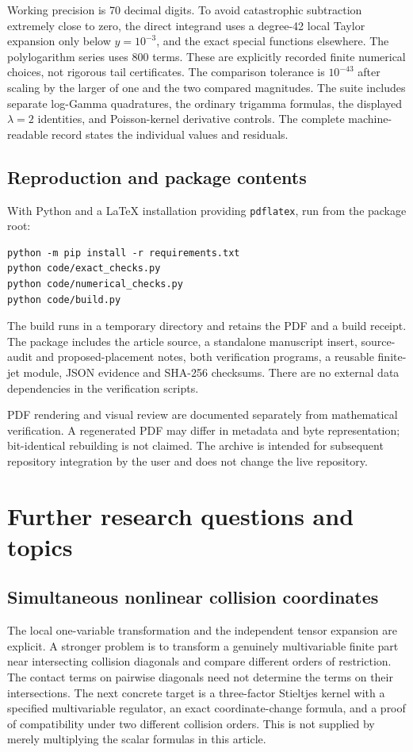 \documentclass[11pt]{article}
\theoremstyle{definition}\newtheorem{definition}[theorem]{Definition}
\theoremstyle{remark}\newtheorem{remark}[theorem]{Remark}
\begin{document}
Working precision is 70 decimal digits. To avoid catastrophic subtraction extremely close to zero, the direct integrand uses a degree-42 local Taylor expansion only below $y=10^{-3}$, and the exact special functions elsewhere. The polylogarithm series uses 800 terms. These are explicitly recorded finite numerical choices, not rigorous tail certificates. The comparison tolerance is $10^{-43}$ after scaling by the larger of one and the two compared magnitudes. The suite includes separate log-Gamma quadratures, the ordinary trigamma formulas, the displayed $\lambda=2$ identities, and Poisson-kernel derivative controls. The complete machine-readable record states the individual values and residuals.



\subsection{Reproduction and package contents}
With Python and a LaTeX installation providing \texttt{pdflatex}, run from the package root:
\begin{verbatim}
python -m pip install -r requirements.txt
python code/exact_checks.py
python code/numerical_checks.py
python code/build.py
\end{verbatim}
The build runs in a temporary directory and retains the PDF and a build receipt. The package includes the article source, a standalone manuscript insert, source-audit and proposed-placement notes, both verification programs, a reusable finite-jet module, JSON evidence and SHA-256 checksums. There are no external data dependencies in the verification scripts.

PDF rendering and visual review are documented separately from mathematical verification. A regenerated PDF may differ in metadata and byte representation; bit-identical rebuilding is not claimed. The archive is intended for subsequent repository integration by the user and does not change the live repository.

\section{Further research questions and topics}
\label{sec:questions}
\subsection{Simultaneous nonlinear collision coordinates}
The local one-variable transformation and the independent tensor expansion are explicit. A stronger problem is to transform a genuinely multivariable finite part near intersecting collision diagonals and compare different orders of restriction. The contact terms on pairwise diagonals need not determine the terms on their intersections. The next concrete target is a three-factor Stieltjes kernel with a specified multivariable regulator, an exact coordinate-change formula, and a proof of compatibility under two different collision orders. This is not supplied by merely multiplying the scalar formulas in this article.
\end{document}
